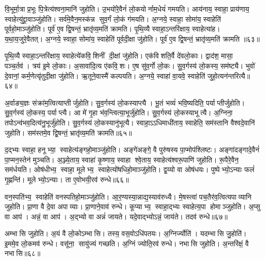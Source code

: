 वि॒भूर्मा॒त्रा प्र॒भूः पि॒त्रेत्य॑श्वना॒मानि॑ जुहोति। उ॒भयो॑रे॒वैनं॑ लो॒कयोर्नाम॒धेयं॑ गमयति। आय॑नाय॒ स्वाहा॒ प्राय॑णाय॒ स्वाहेत्यु॑द्द्रा॒वाञ्जु॑होति। सर्व॑मे॒वैन॒मस्क॑न्न सुव॒र्गं लो॒कं ग॑मयति। अ॒ग्नये॒ स्वाहा॒ सोमा॑य॒ स्वाहेति॑ पूर्वहो॒माञ्जु॑होति। पूर्व॑ ए॒व द्वि॒षन्तं॒ भ्रातृ॑व्य॒मति॑ क्रामति। पृ॒थि॒व्यै स्वाहा॒ऽन्तरि॑क्षाय॒ स्वाहेत्या॑ह। य॒था॒य॒जुरे॒वैतत्। अ॒ग्नये॒ स्वाहा॒ सोमा॑य॒ स्वाहेति॑ पूर्वदी॒क्षा जु॑होति। पूर्व॑ ए॒व द्वि॒षन्तं॒ भ्रातृ॑व्य॒मति॑ क्रामति ॥६३॥

पृ॒थि॒व्यै स्वाहा॒ऽन्तरि॑क्षाय॒ स्वाहेत्ये॑कवि॒शिनीं दी॒क्षां जु॑होति। एक॑विशति॒र्वै दे॑वलो॒काः। द्वाद॑श॒ मासा॒ पञ्च॒र्तव॑। त्रय॑ इ॒मे लो॒काः। अ॒सावा॑दि॒त्य ए॑कवि॒शः। ए॒ष सु॑व॒र्गो लो॒कः। सु॒व॒र्गस्य॑ लो॒कस्य॒ सम॑ष्ट्यै। भुवो॑ दे॒वानां॒ कर्म॒णेत्यृ॑तुदी॒क्षा जु॑होति। ऋ॒तूने॒वास्मै॑ कल्पयति। अ॒ग्नये॒ स्वाहा॑ वा॒यवे॒ स्वाहेति॑ जुहो॒त्यन॑न्तरित्यै॥६४॥

अ॒र्वाङ्य॒ज्ञः संक्रा॑म॒त्वित्याप्तीर्जुहोति। सु॒व॒र्गस्य॑ लो॒कस्याप्त्यै। भू॒तं भव्यं॑ भवि॒ष्यदिति॒ पर्याप्तीर्जुहोति। सु॒व॒र्गस्य॑ लो॒कस्य॒ पर्याप्त्यै। आ मे॑ गृ॒हा भ॑व॒न्त्वित्या॒भूर्जु॑होति। सु॒व॒र्गस्य॑ लो॒कस्याभूत्यै। अ॒ग्निना॒ तपोऽन्व॑भव॒दित्य॑नु॒भूर्जु॑होति। सु॒व॒र्गस्य॑ लो॒कस्यानु॑भूत्यै। स्वाहा॒ऽऽधिमाधी॑ताय॒ स्वाहेति॒ सम॑स्तानि वैश्वदे॒वानि॑ जुहोति। सम॑स्तमे॒व द्वि॒षन्तं॒ भ्रातृ॑व्य॒मति॑ क्रामति॥६५॥

द॒द्भ्यः स्वाहा॒ हनूभ्या॒ स्वाहेत्य॑ङ्गहो॒माञ्जु॑होति। अङ्गे॑अङ्गे॒ वै पुरु॑षस्य पा॒प्मोप॑श्लिष्टः। अङ्गा॑दङ्गादे॒वैनं॑ पा॒प्मन॒स्तेन॑ मुञ्चति। अ॒ञ्ज्ये॒ताय॒ स्वाहा॑ कृ॒ष्णाय॒ स्वाहा श्वे॒ताय॒ स्वाहेत्य॑श्वरू॒पाणि॑ जुहोति। रू॒पैरे॒वैन॒ सम॑र्धयति। ओष॑धीभ्य॒ स्वाहा॒ मूलेभ्य॒ स्वाहेत्यो॑षधिहो॒माञ्जु॑होति। द्व॒य्यो वा ओष॑धयः। पुष्पेभ्यो॒ऽन्याः फलं॑ गृ॒ह्णन्ति॑। मूलेभ्यो॒ऽन्याः। ता ए॒वोभयी॒रव॑ रुन्धे॥६६॥

वन॒स्पति॑भ्य॒ स्वाहेति॑ वनस्पतिहो॒माञ्जु॑होति। आ॒र॒ण्यस्या॒न्नाद्य॒स्याव॑रुध्यै। मे॒षस्त्वा॑ पच॒तैर॑व॒त्वित्यपाव्यानि जुहोति। प्रा॒णा वै दे॒वा अपाव्याः। प्रा॒णाने॒वाव॑ रुन्धे। कूप्याभ्य॒ स्वाहा॒द्भ्यः स्वाहेत्य॒पा होमाञ्जुहोति। अ॒प्सु वा आप॑। अन्नं॒ वा आप॑। अ॒द्भ्यो वा अन्नं॑ जायते। यदे॒वाद्भ्योऽन्नं॒ जाय॑ते। तदव॑ रुन्धे॥६७॥\anuvakamend[पू॒र्व॒दी॒क्षा जु॑होति॒ पूर्व॑ ए॒व द्वि॒षन्तं॒ भ्रातृ॑व्य॒मति॑ क्राम॒त्यन॑न्तरित्यै क्रामति रुन्धे॒ जाय॑त॒ एकं॑ च]

अम्भासि जुहोति। अ॒यं वै लो॒कोऽम्भासि। तस्य॒ वस॒वोऽधि॑पतयः। अ॒ग्निर्ज्योति॑। यदम्भासि जु॒होति॑। इ॒ममे॒व लो॒कमव॑ रुन्धे। वसू॑ना॒ सायु॑ज्यं गच्छति। अ॒ग्निं ज्योति॒रव॑ रुन्धे। नभासि जुहोति। अ॒न्तरि॑क्षं॒ वै नभासि॥६८॥

